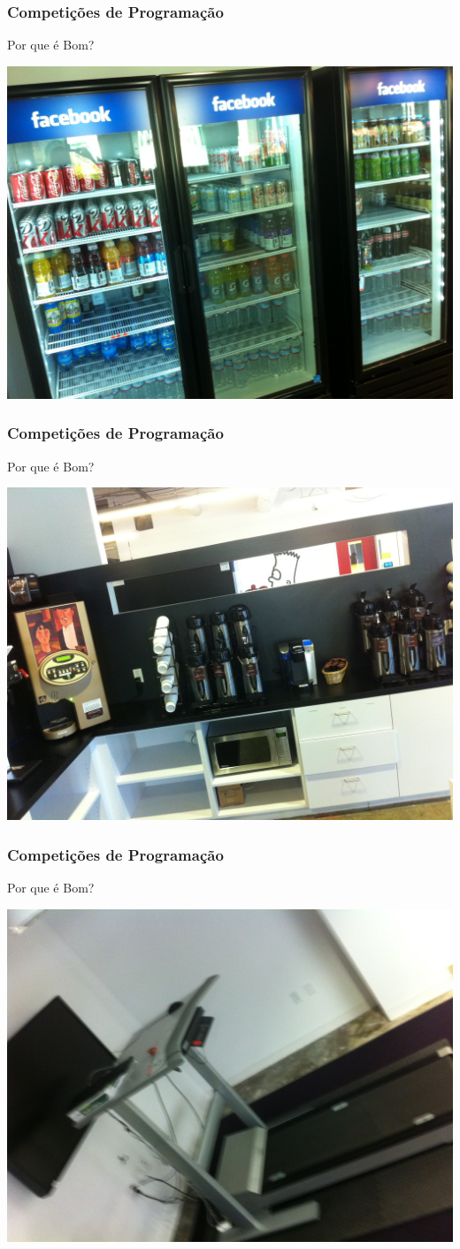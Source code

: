 \begin{frame}
\frametitle{Competições de Programação}
\begin{block}{Por que é Bom?}
\begin{center}
	\includegraphics[width=.7\textwidth]{sntc/IMG_2062.JPG}
\end{center}
\end{block}
\end{frame}
\begin{frame}
\frametitle{Competições de Programação}
\begin{block}{Por que é Bom?}
\begin{center}
	\includegraphics[width=.7\textwidth]{sntc/IMG_2064.JPG}
\end{center}
\end{block}
\end{frame}
\begin{frame}
\frametitle{Competições de Programação}
\begin{block}{Por que é Bom?}
\begin{center}
	\includegraphics[width=.7\textwidth]{sntc/IMG_2066.JPG}
\end{center}
\end{block}
\end{frame}
